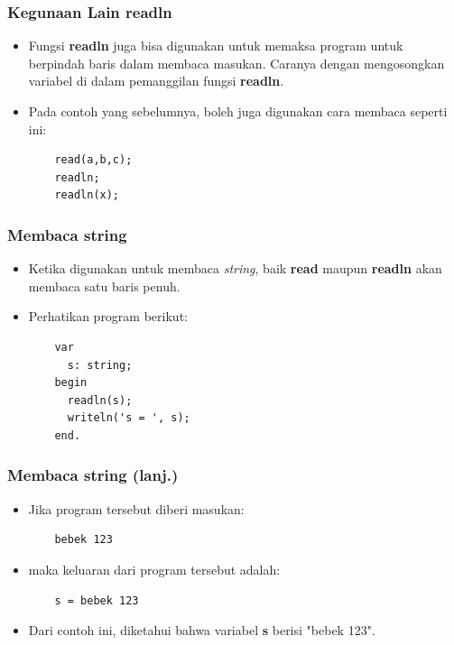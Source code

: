 \begin{frame}[fragile]
\frametitle{Kegunaan Lain readln}
\begin{itemize}
  \item Fungsi \textbf{readln} juga bisa digunakan untuk memaksa program untuk berpindah baris dalam membaca masukan. Caranya dengan mengosongkan variabel di dalam pemanggilan fungsi \textbf{readln}.
  \item Pada contoh yang sebelumnya, boleh juga digunakan cara membaca seperti ini:
  \begin{lstlisting}
    read(a,b,c);
    readln;
    readln(x);
  \end{lstlisting}
\end{itemize}
\end{frame}

\begin{frame}[fragile]
\frametitle{Membaca string}
\begin{itemize}
  \item Ketika digunakan untuk membaca \textit{string}, baik \textbf{read} maupun \textbf{readln} akan membaca satu baris penuh.
  \item Perhatikan program berikut:
  \begin{lstlisting}
    var
      s: string;
    begin
      readln(s);
      writeln('s = ', s);
    end.
  \end{lstlisting}
\end{itemize}
\end{frame}

\begin{frame}[fragile]
\frametitle{Membaca string (lanj.)}
\begin{itemize}
  \item Jika program tersebut diberi masukan:
  \begin{lstlisting}
    bebek 123
  \end{lstlisting}
  \item maka keluaran dari program tersebut adalah:
  \begin{lstlisting}
    s = bebek 123
  \end{lstlisting}
  \item Dari contoh ini, diketahui bahwa variabel \textbf{s} berisi "bebek 123".
\end{itemize}
\end{frame}

